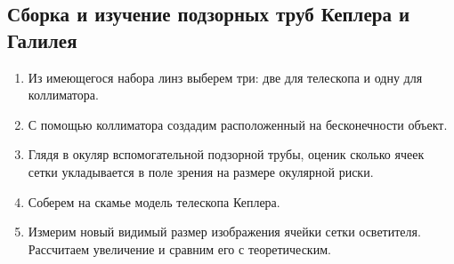 \documentclass[14pt, a4paper]{report}
\begin{document}
\subsection{Сборка и изучение подзорных труб Кеплера и Галилея}

\begin{enumerate}

\item Из имеющегося набора линз выберем три: две для телескопа и одну для коллиматора.

\item С помощью коллиматора создадим расположенный на бесконечности объект.

\item Глядя в окуляр вспомогательной подзорной трубы, оценик сколько ячеек сетки укладывается в поле зрения на размере окулярной риски.

\item Соберем на скамье модель телескопа Кеплера.

\item Измерим новый видимый размер изображения ячейки сетки осветителя. Рассчитаем увеличение и сравним его с теоретическим.


\end{enumerate}
\end{document}
